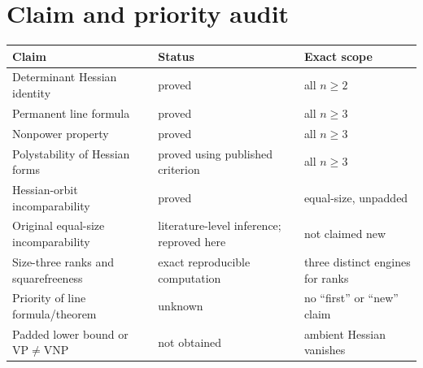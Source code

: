 \documentclass[11pt]{article}
\theoremstyle{remark}
\begin{document}
\section{Claim and priority audit}
\begin{center}
\small
\begin{tabular}{@{}L{.43\linewidth}L{.20\linewidth}L{.28\linewidth}@{}}
\toprule
Claim & Status & Exact scope \\
\midrule
Determinant Hessian identity & proved & all $n\geq2$ \\
Permanent line formula & proved & all $n\geq3$ \\
Nonpower property & proved & all $n\geq3$ \\
Polystability of Hessian forms & proved using published criterion & all $n\geq3$ \\
Hessian-orbit incomparability & proved & equal-size, unpadded \\
Original equal-size incomparability & literature-level inference; reproved here & not claimed new \\
Size-three ranks and squarefreeness & exact reproducible computation & three distinct engines for ranks \\
Priority of line formula/theorem & unknown & no ``first'' or ``new'' claim \\
Padded lower bound or $\mathrm{VP}\neq\mathrm{VNP}$ & not obtained & ambient Hessian vanishes \\
\bottomrule
\end{tabular}
\end{center}
\end{document}
